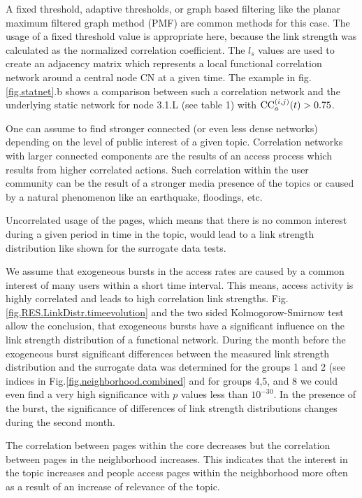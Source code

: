 \documentclass[a4paper,10pt]{scrbook}
\begin{document}
A fixed threshold, adaptive thresholds, or graph based filtering like the planar
maximum filtered graph method (PMF) are common methods for this case. The usage
of a fixed threshold value is appropriate here, because the link strength was
calculated as the normalized correlation coefficient. The $l_s$ values are used
to create an adjacency matrix which represents a local functional correlation
network around a central node CN at a given time. The example in
fig.\ref{fig.statnet}.b shows a comparison between such a correlation network
and the underlying static network for node 3.1.L (see table 1) with ${\rm
CC}_a^{(i,j)}(t) > 0.75$.

One can assume to find stronger connected (or even less dense networks)
depending on the level of public interest of a given topic. Correlation
networks with larger connected components are the results of an access process
which results from higher correlated actions. Such correlation within
the user community can be the result of a stronger media presence of the
topics or caused by a natural phenomenon like an earthquake, floodings,
etc.

Uncorrelated usage of the pages, which means that there is no common interest
during a given period in time in the topic, would lead to a link strength
distribution like shown for the surrogate data tests.

We assume that exogeneous bursts in the access rates are caused by a
common interest of many users within a short time interval. This means,
access activity is highly correlated and leads to high  correlation
link strengths. Fig.\ref{fig.RES.LinkDistr.timeevolution} and the two sided
Kolmogorow-Smirnow test \cite{Young.1977} allow the
conclusion, that exogeneous bursts have a significant influence on the link
strength distribution of a functional network. During the month before the
exogeneous burst significant differences between the measured link strength
distribution and the surrogate data was determined for the groups 1 and 2 (see
indices in Fig.\ref{fig.neighborhood.combined} and for groups 4,5, and 8 we
could even find a very high significance with $p$ values less than $10^{-30}$.
In the presence of the burst, the significance of differences of link strength
distributions changes during the second month.

The correlation between pages within the core decreases but the correlation
between pages in the neighborhood increases. This indicates that the interest in
the topic increases and people access pages within the neighborhood more often
as a result of an increase of relevance of the topic.
\clearpage
\newpage
\end{document}
